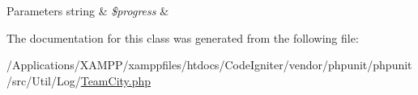 \begin{DoxyParams}[1]{Parameters}
string & {\em \$progress} & \\
\hline
\end{DoxyParams}


The documentation for this class was generated from the following file\+:\begin{DoxyCompactItemize}
\item 
/\+Applications/\+X\+A\+M\+P\+P/xamppfiles/htdocs/\+Code\+Igniter/vendor/phpunit/phpunit/src/\+Util/\+Log/\mbox{\hyperlink{_team_city_8php}{Team\+City.\+php}}\end{DoxyCompactItemize}
